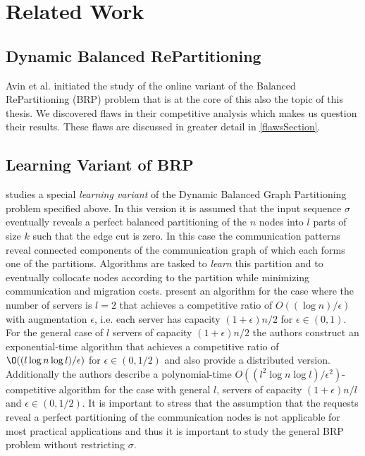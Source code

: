 \documentclass[xcolor=dvipsnames, tikz, 11pt]{article}
\newcommand{\nl}{\newline}
\newcommand{\crep}{C{\scriptsize REP}}
\theoremstyle{definition}
\begin{document}
	\section{Related Work}
	\subsection{Dynamic Balanced RePartitioning}
	Avin et al.\cite{Avin2015a} initiated the study of the online variant of the Balanced RePartitioning (BRP) problem that is at the core of this also the topic of this thesis. We discovered flaws in their competitive analysis which makes us question their results. These flaws are discussed in greater detail in \cref{flawsSection}. %
	
	\subsection{Learning Variant of BRP}
	\cite{Henzinger2019} studies a special \textit{learning variant} of the Dynamic Balanced Graph Partitioning problem specified above. In this version it is assumed that the input sequence $\sigma$ eventually reveals a perfect balanced partitioning of the $n$ nodes into $l$ parts of size $k$ such that the edge cut is zero. In this case the communication patterns reveal connected components of the communication graph of which each forms one of the partitions. Algorithms are tasked to \textit{learn} this partition and to eventually collocate nodes according to the partition while minimizing communication and migration costs.\nl
	\cite{Henzinger2019} present an algorithm for the case where the number of servers is $l=2$ that achieves a competitive ratio of $O((\log n)/\epsilon)$ with augmentation $\epsilon$, i.e. each server has capacity $(1+\epsilon)n/2$ for $\epsilon\in(0,1)$.\nl
	For the general case of $l$ servers of capacity $(1+\epsilon)n/2$ the authors construct an exponential-time algorithm that achieves a competitive ratio of $\O((l\log n \log l)/\epsilon)$ for $\epsilon\in(0,1/2)$ and also provide a distributed version.\nl
	Additionally the authors describe a polynomial-time $O((l^2\log n\log l)/\epsilon^2)$-competitive algorithm for the case with general $l$, servers of capacity $(1+\epsilon)n/l$ and $\epsilon\in(0,1/2)$.\nl
	It is important to stress that the assumption that the requests reveal a perfect partitioning of the communication nodes is not applicable for most practical applications and thus it is important to study the general BRP problem without restricting $\sigma$.
	
\end{document}
